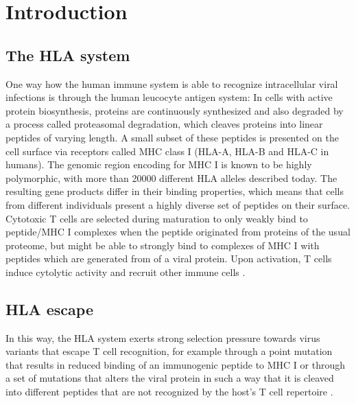 \documentclass[fleqn,11pt]{SelfArx} %
\affiliation{\textsuperscript{1}\textit{Bioinformatics \& Computational Biophysics, Faculty of Biology, University of Duisburg-Essen, 45117 Essen, Germany}} %
\begin{document}
\flushbottom %

\maketitle %

{
  \hypersetup{linkcolor=black}
  \tableofcontents
}


\section{Introduction}

\subsection{The HLA system}

One way how the human immune system is able to recognize intracellular viral infections
is through the human leucocyte antigen system\nolinebreak\cite{Germain1994}:
In cells with active protein biosynthesis, proteins are continuously synthesized
and also degraded by a process called proteasomal degradation, which cleaves
proteins into linear peptides of varying length\nolinebreak\cite{Goldberg2002}.
A small subset of these peptides is presented on the cell surface via
receptors called MHC class I (HLA-A, HLA-B and HLA-C in humans). The genomic region encoding 
for MHC I is known to be highly polymorphic, with more than 20000 different HLA alleles 
described today\nolinebreak\cite{Robinson2014}.
The resulting gene products differ in their binding properties, which means that
cells from different individuals present a highly diverse set of peptides on their
surface.
Cytotoxic T cells are selected during maturation to only weakly bind to 
peptide/MHC I complexes when the peptide originated from proteins of the usual proteome, 
but might be able to strongly bind to complexes of MHC I with peptides which are 
generated from of a viral protein\nolinebreak\cite{Murata2007}.
Upon activation, T cells induce cytolytic activity and recruit other immune cells
\nolinebreak\cite{Harty2000}.

\subsection{HLA escape}
In this way, the HLA system exerts strong selection pressure towards virus variants
that escape T cell recognition\nolinebreak\cite{Borrow1997}, for example through a point 
mutation that results in reduced binding of an immunogenic peptide to MHC I or through a
set of mutations that alters the viral protein in such a way that it is cleaved into 
different peptides that are not recognized by the host's T cell repertoire
\nolinebreak\cite{Yewdell2002}.
\end{document}
